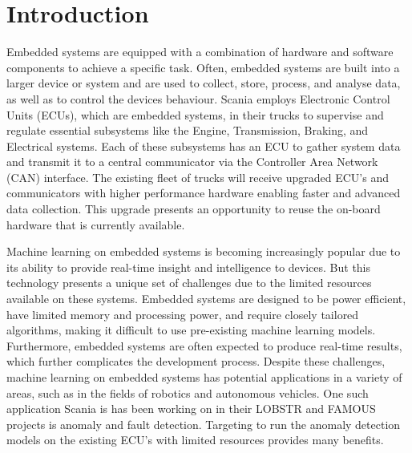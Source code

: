 \part{Introduction}

Embedded systems are equipped with a combination of hardware and software components to achieve a specific task. Often, embedded systems are built into a larger device or system and are used to collect, store, process, and analyse data, as well as to control the device\textquotesingle s behaviour. 
Scania employs Electronic Control Units (ECUs), which are embedded systems, in their trucks to supervise and regulate essential subsystems like the Engine, Transmission, Braking, and Electrical systems. Each of these subsystems has an ECU to gather system data and transmit it to a central communicator via the Controller Area Network (CAN) interface. The existing fleet of trucks
will receive upgraded ECU's and communicators with higher performance hardware enabling faster and advanced data collection. This upgrade presents an opportunity to reuse the on-board hardware that is currently available.

Machine learning on embedded systems is becoming increasingly popular due to its ability to provide real-time insight and intelligence to devices. But this technology presents a unique set of challenges due to the limited resources available on these systems. Embedded systems are designed to be power efficient, have limited memory and processing power, and require closely tailored algorithms, making it difficult to use pre-existing machine learning models. Furthermore, embedded systems are often expected to produce real-time results, which further complicates the development process. Despite these challenges, machine learning on embedded systems has potential applications in a variety of areas, such as in the fields of robotics and autonomous vehicles. %
One such application Scania is has been working on in their  \textsc{LOBSTR} and \textsc{FAMOUS} projects is anomaly and fault detection. Targeting to run the anomaly detection models on the existing ECU's with limited resources provides many benefits. 

